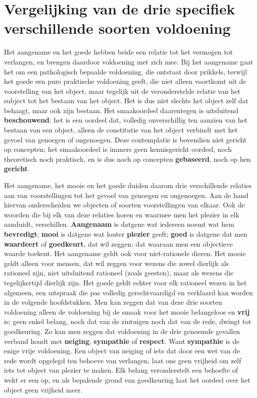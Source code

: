 \section{Vergelijking van de drie specifiek verschillende soorten voldoening}

Het aangename en het goede hebben beide een relatie tot het vermogen tot verlangen, en brengen daardoor voldoening met zich mee. 
Bij het aangename gaat het om een pathologisch bepaalde voldoening, die ontstaat door prikkels, terwijl het goede een pure praktische voldoening geeft, die niet alleen voortkomt uit de voorstelling van het object, maar tegelijk uit de veronderstelde relatie van het subject tot het bestaan van het object. 
Het is dus niet slechts het object zelf dat behaagt, maar ook zijn bestaan.
Het smaakoordeel daarentegen is uitsluitend \textbf{beschouwend}: het is een oordeel dat, volledig onverschillig ten aanzien van het bestaan van een object, alleen de constitutie van het object verbindt met het gevoel van genoegen of ongenoegen. 
Deze contemplatie is bovendien niet gericht op concepten; het smaakoordeel is immers geen kennisgericht oordeel, noch theoretisch noch praktisch, en is dus noch op concepten \textbf{gebaseerd}, noch op hen \textbf{gericht}.

Het aangename, het mooie en het goede duiden daarom drie verschillende relaties aan van voorstellingen tot het gevoel van genoegen en ongenoegen. 
Aan de hand hiervan onderscheiden we objecten of soorten voorstellingen van elkaar. 
Ook de woorden die bij elk van deze relaties horen en waarmee men het plezier in elk aanduidt, verschillen. 
\textbf{Aangenaam} is datgene wat iedereen noemt wat hem \textbf{bevredigt}; \textbf{mooi} is datgene wat louter \textbf{plezier} geeft; \textbf{goed} is datgene dat men \textbf{waardeert} of \textbf{goedkeurt}, dat wil zeggen: dat waaraan men een objectieve waarde toekent.
Het aangename geldt ook voor niet-rationele dieren. 
Het mooie geldt alleen voor mensen, dat wil zeggen voor wezens die zowel dierlijk als rationeel zijn, niet uitsluitend rationeel (zoals geesten), maar als wezens die tegelijkertijd dierlijk zijn. 
Het goede geldt echter voor elk rationeel wezen in het algemeen, een uitspraak die pas volledig gerechtvaardigd en verklaard kan worden in de volgende hoofdstukken.
Men kan zeggen dat van deze drie soorten voldoening alleen de voldoening bij de smaak voor het mooie belangeloos en \textbf{vrij} is; geen enkel belang, noch dat van de zintuigen noch dat van de rede, dwingt tot goedkeuring. 
Zo kan men zeggen dat voldoening in de drie genoemde gevallen verband houdt met \textbf{neiging}, \textbf{sympathie} of \textbf{respect}. 
Want \textbf{sympathie} is de enige vrije voldoening. 
Een object van neiging of iets dat door een wet van de rede wordt opgelegd ten behoeve van verlangen, laat ons geen vrijheid om zelf iets tot object van plezier te maken. 
Elk belang veronderstelt een behoefte of wekt er een op, en als bepalende grond van goedkeuring laat het oordeel over het object geen vrijheid meer.

